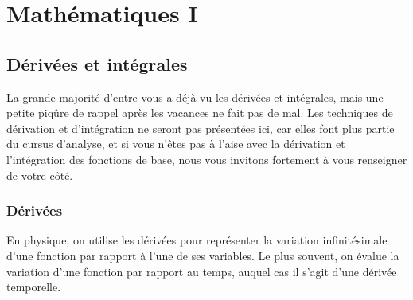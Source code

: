\documentclass{article}
\begin{document}
\section{Mathématiques I}

\subsection{Dérivées et intégrales}
La grande majorité d'entre vous a déjà vu les dérivées et intégrales, mais une petite piqûre de rappel après les vacances ne fait pas de mal. Les techniques de dérivation et d'intégration ne seront pas présentées ici, car elles font plus partie du cursus d'analyse, et si vous n'êtes pas à l'aise avec la dérivation et l'intégration des fonctions de base, nous vous invitons fortement à vous renseigner de votre côté.

\subsubsection{Dérivées}
En physique, on utilise les dérivées pour représenter la variation infinitésimale d'une fonction par rapport à l'une de ses variables. Le plus souvent, on évalue la variation d'une fonction par rapport au temps, auquel cas il s'agit d'une dérivée temporelle. 
\end{document}
